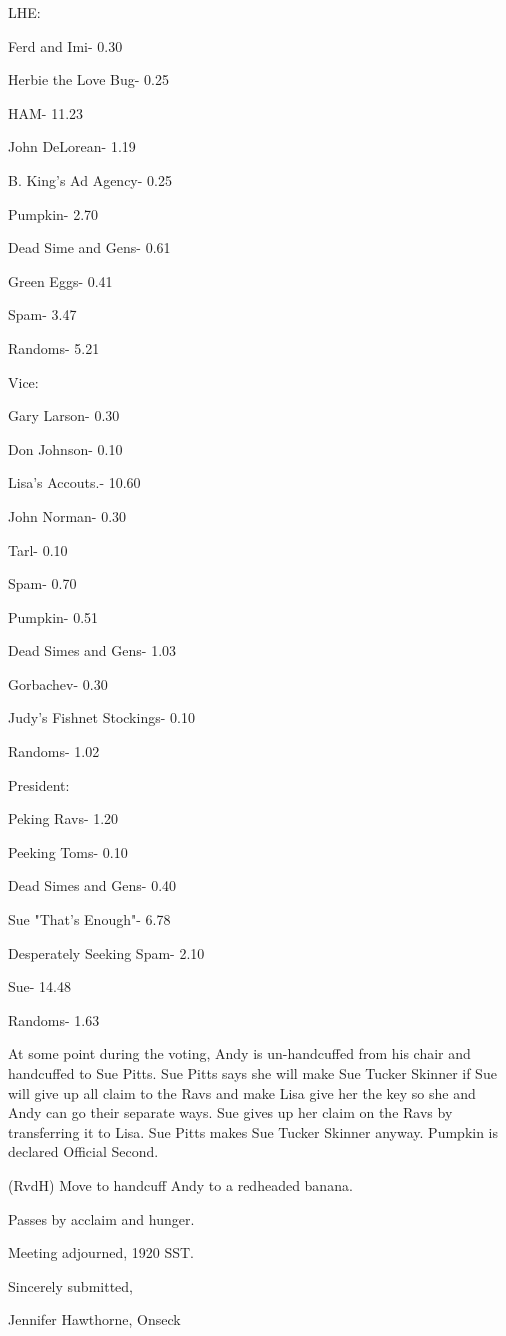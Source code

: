 \documentclass[12pt]{article}
\begin{document}
LHE:

Ferd and Imi- 0.30

Herbie the Love Bug- 0.25

HAM- 11.23

John DeLorean- 1.19

B. King's Ad Agency- 0.25

Pumpkin- 2.70

Dead Sime and Gens- 0.61

Green Eggs- 0.41

Spam- 3.47

Randoms- 5.21

Vice:

Gary Larson- 0.30

Don Johnson- 0.10

Lisa's Accouts.- 10.60

John Norman- 0.30

Tarl- 0.10

Spam- 0.70

Pumpkin- 0.51

Dead Simes and Gens- 1.03

Gorbachev- 0.30

Judy's Fishnet Stockings- 0.10

Randoms- 1.02

President:

Peking Ravs- 1.20

Peeking Toms- 0.10

Dead Simes and Gens- 0.40

Sue "That's Enough"- 6.78

Desperately Seeking Spam- 2.10

Sue- 14.48

Randoms- 1.63

At some point during the voting, Andy is un-handcuffed from his chair and handcuffed to Sue Pitts. Sue Pitts says she will make Sue Tucker Skinner if Sue will give up all claim to the Ravs and make Lisa give her the key so she and Andy can go their separate ways. Sue gives up her claim on the Ravs by transferring it to Lisa. Sue Pitts makes Sue Tucker Skinner anyway. Pumpkin is declared Official Second.

(RvdH) Move to handcuff Andy to a redheaded banana.

Passes by acclaim and hunger.

\vspace{12pt}

\noindent
Meeting adjourned, 1920 SST.

\vspace{18pt}

\centerline{Sincerely submitted,}
\centerline{Jennifer Hawthorne, Onseck}
\end{document}
